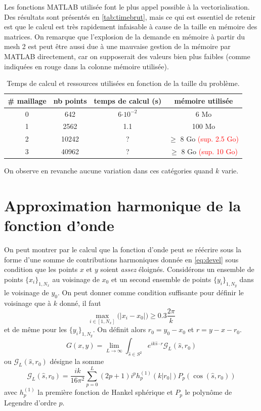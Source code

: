 \documentclass[11pt]{article}
\newcommand{\hs}{\hat{s}}
\newcommand{\lG}{\mathcal{G}}
\begin{document}
Les fonctions MATLAB utilisée font le plus appel possible à la vectorialisation. Des résultats sont présentés en \autoref{tab:timebrut}, mais
ce qui est essentiel de retenir est que le calcul est très rapidement infaisable à cause de la taille en mémoire des matrices. On remarque
que l'explosion de la demande en mémoire à partir du mesh 2 est peut être aussi due à une mauvaise gestion de la mémoire par MATLAB
directement, car on supposerait des valeurs bien plus faibles (comme indiquées en rouge dans la colonne mémoire utilisée).
\begin{table}
  \centering
  \begin{tabular}{cccc}
    \# maillage & nb points & temps de calcul (s) & mémoire utilisée                           \\
    \hline 
    0           & 642       & 6$\cdot10^{-2}$     & 6 Mo                                       \\
    1           & 2562      & 1.1                 & 100 Mo                                     \\
    2           & 10242     & ?                   & $\geq$ 8 Go \textcolor{red}{(sup. 2.5 Go)} \\
    3           & 40962     & ?                   & $\geq$ 8 Go \textcolor{red}{(sup. 10 Go)}
  \end{tabular}
  \caption{Temps de calcul et ressources utilisées en fonction de la taille du problème.}
  \label{tab:timebrut}
\end{table}

On observe en revanche aucune variation dans ces catégories quand $k$ varie.

\section{Approximation harmonique de la fonction d'onde}

On peut montrer par le calcul que la fonction d'onde peut se réécrire sous la forme d'une somme de contributions harmoniques donnée en
\ref{eq:devel} sous condition que les points $x$ et $y$ soient \emph{assez} éloignés. Considérons un ensemble de points $\{x_i\}_{1, N_x}$ au
voisinage de $x_0$ et un second ensemble de points $\{y_i\}_{1, N_y}$ dans le voisinage de $y_0$. On peut donner comme condition suffisante
pour définir le voisinage que à $k$ donné, il faut
\[
  \max_{i\in[1,N_x]}\big(|x_i-x_0|\big)\geq 0.3 \frac{2\pi}{k}
\]
et de même pour les $\{y_i\}_{1, N_y}$. On définit alors $r_0 = y_0-x_0$ et $r=y-x-r_0$.
\begin{equation}
  \label{eq:devel}
  G(x, y) = \lim_{L\to\infty} \int_{\hs\in S^2} e^{ik \hs \cdot r} \lG_L(\hs, r_0)
\end{equation}
ou $\lG_L(\hs, r_0)$ désigne la somme
\begin{equation}
  \label{eq:GL}
  \lG_L(\hs, r_0) = \frac{ik}{16\pi^2} \sum_{p=0}^{L} (2p+1) i^p h_p^{(1)}(k|r_0|) P_p(\cos(\hs, r_0))
\end{equation}
avec $h_p^{(1)}$ la première fonction de Hankel sphérique et $P_p$ le polynôme de Legendre d'ordre $p$.
\end{document}
